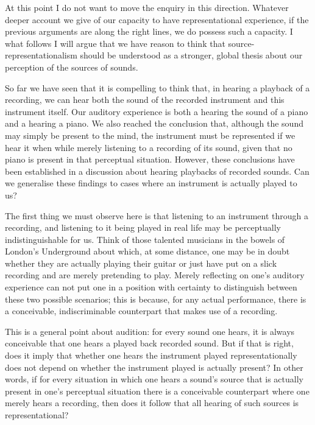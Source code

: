 \documentclass[sloppy, journal, git, bytitle, dodraft]{humapap}
\begin{document}
At this point I do not want to move the enquiry in this direction. Whatever deeper account we give of our capacity to have representational experience, if the previous arguments are along the right lines, we do possess such a capacity. I what follows I will argue that we have reason to think that source-representationalism should be understood as a stronger, global thesis about our perception of the sources of sounds. 


\sect So far we have seen that it is compelling to think that, in hearing a playback of a recording, we can hear both the sound of the recorded instrument and this instrument itself. Our auditory experience is both a hearing the sound of a piano and a hearing a piano. We also reached the conclusion that, although the sound may simply be present to the mind, the instrument must be represented if we hear it when while merely listening to a recording of its sound, given that no piano is present in that perceptual situation. However, these conclusions have been established in a discussion about hearing playbacks of recorded sounds. Can we generalise these findings to cases where an instrument is actually played to us? 

The first thing we must observe here is that listening to an instrument through a recording, and listening to it being played in real life may be perceptually indistinguishable for us. Think of those talented musicians in the bowels of London's Underground about which, at some distance, one may be in doubt whether they are actually playing their guitar or just have put on a slick recording and are merely pretending to play. Merely reflecting on one's auditory experience can not put one in a position with certainty to distinguish between these two possible scenarios; this is because, for any actual performance, there is a conceivable, indiscriminable counterpart that makes use of a recording. 

This is a general point about audition: for every sound one hears, it is always conceivable that one hears a played back recorded sound. But if that is right, does it imply that whether one hears the instrument played representationally does not depend on whether the instrument played is actually present? In other words, if for every situation in which one hears a sound's source that is actually present in one's perceptual situation there is a conceivable counterpart where one merely hears a recording, then does it follow that all hearing of such sources is representational? 
\end{document}
